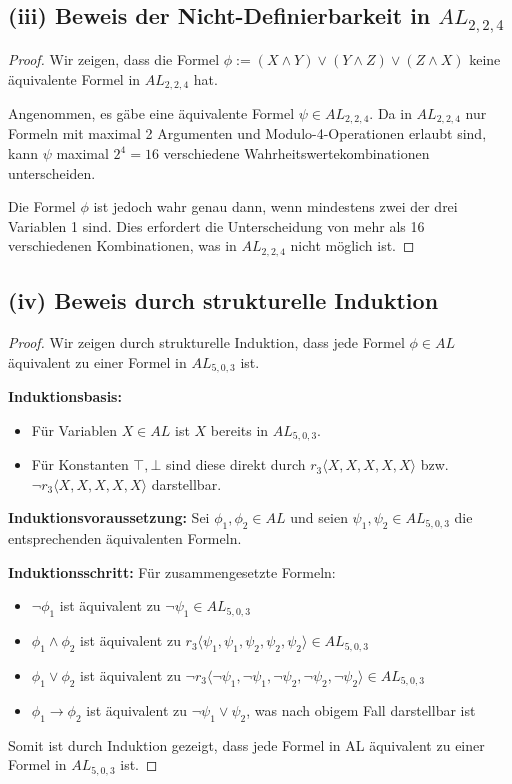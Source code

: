 \documentclass[12pt,a4paper]{article}
\begin{document}
\subsection*{(iii) Beweis der Nicht-Definierbarkeit in $AL_{2,2,4}$}

\begin{proof}
Wir zeigen, dass die Formel $\phi := (X \land Y) \lor (Y \land Z) \lor (Z \land X)$ keine äquivalente Formel in $AL_{2,2,4}$ hat.

Angenommen, es gäbe eine äquivalente Formel $\psi \in AL_{2,2,4}$. Da in $AL_{2,2,4}$ nur Formeln mit maximal 2 Argumenten und Modulo-4-Operationen erlaubt sind, kann $\psi$ maximal $2^4 = 16$ verschiedene Wahrheitswertekombinationen unterscheiden.

Die Formel $\phi$ ist jedoch wahr genau dann, wenn mindestens zwei der drei Variablen 1 sind. Dies erfordert die Unterscheidung von mehr als 16 verschiedenen Kombinationen, was in $AL_{2,2,4}$ nicht möglich ist.
\end{proof}

\subsection*{(iv) Beweis durch strukturelle Induktion}

\begin{proof}
Wir zeigen durch strukturelle Induktion, dass jede Formel $\phi \in AL$ äquivalent zu einer Formel in $AL_{5,0,3}$ ist.

\textbf{Induktionsbasis:} 
\begin{itemize}
    \item Für Variablen $X \in AL$ ist $X$ bereits in $AL_{5,0,3}$.
    \item Für Konstanten $\top, \bot$ sind diese direkt durch $r_3\langle X,X,X,X,X \rangle$ bzw. $\neg r_3\langle X,X,X,X,X \rangle$ darstellbar.
\end{itemize}

\textbf{Induktionsvoraussetzung:} Sei $\phi_1, \phi_2 \in AL$ und seien $\psi_1, \psi_2 \in AL_{5,0,3}$ die entsprechenden äquivalenten Formeln.

\textbf{Induktionsschritt:} Für zusammengesetzte Formeln:
\begin{itemize}
    \item $\neg \phi_1$ ist äquivalent zu $\neg \psi_1 \in AL_{5,0,3}$
    \item $\phi_1 \land \phi_2$ ist äquivalent zu $r_3\langle \psi_1, \psi_1, \psi_2, \psi_2, \psi_2 \rangle \in AL_{5,0,3}$
    \item $\phi_1 \lor \phi_2$ ist äquivalent zu $\neg r_3\langle \neg\psi_1, \neg\psi_1, \neg\psi_2, \neg\psi_2, \neg\psi_2 \rangle \in AL_{5,0,3}$
    \item $\phi_1 \rightarrow \phi_2$ ist äquivalent zu $\neg \psi_1 \lor \psi_2$, was nach obigem Fall darstellbar ist
\end{itemize}

Somit ist durch Induktion gezeigt, dass jede Formel in AL äquivalent zu einer Formel in $AL_{5,0,3}$ ist.
\end{proof}
\end{document}
